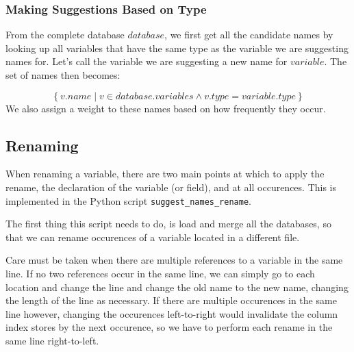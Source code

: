 \subsubsection{Making Suggestions Based on Type}

From the complete database $database$, we first get all the candidate names by
looking up all variables that have the same type as the variable we are
suggesting names for. Let's call the variable we are suggesting a new name for
$variable$. The set of names then becomes:

\[
	\left \{ v.name
			\mid v \in database.variables \land v.type = variable.type \right \}
\]
We also assign a weight to these names based on how frequently they occur.

\subsection{Renaming}

When renaming a variable, there are two main points at which to apply the
rename, the declaration of the variable (or field), and at all occurences.
This is implemented in the Python script \lstinline|suggest_names_rename|.

The first thing this script needs to do, is load and merge all the databases,
so that we can rename occurences of a variable located in a different file.

Care must be taken when there are multiple references to a variable in the same
line. If no two references occur in the same line, we can simply go to each
location and change the line and change the old name to the new name, changing
the length of the line as necessary. If there are multiple occurences in the
same line however, changing the occurences left-to-right would invalidate the
column index stores by the next occurence, so we have to perform each rename in
the same line right-to-left.
